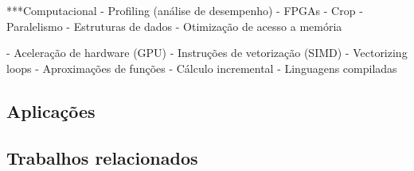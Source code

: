 ***Computacional
- Profiling (análise de desempenho)
- FPGAs
- Crop
- Paralelismo
- Estruturas de dados
- Otimização de acesso a memória

- Aceleração de hardware (GPU)
- Instruções de vetorização (SIMD)
- Vectorizing loops
- Aproximações de funções
- Cálculo incremental
- Linguagens compiladas





\subsection{Aplicações} \label{applications}

\subsection{Trabalhos relacionados} \label{related}
